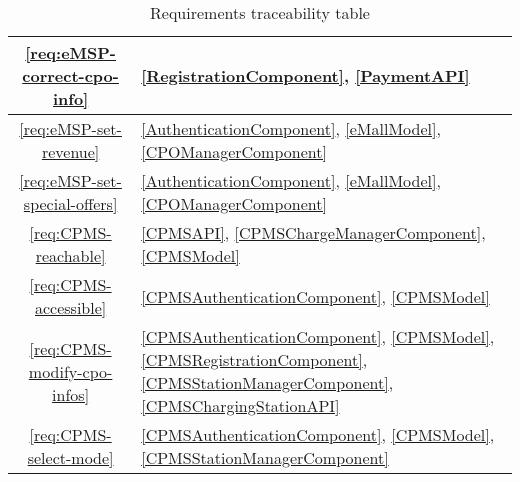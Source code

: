 \begin{table}[h]
\begin{center}
\begin{tabular}{|c||p{15.5cm}|}
                  \hline
                  \ref{req:eMSP-correct-cpo-info}      &
                  \ref{RegistrationComponent},
                  \ref{PaymentAPI}
                  \\
                  \hline
                  \ref{req:eMSP-set-revenue}           &
                  \ref{AuthenticationComponent},
                  \ref{eMallModel},
                  \ref{CPOManagerComponent}
                  \\
                  \hline
                  \ref{req:eMSP-set-special-offers}    &
                  \ref{AuthenticationComponent},
                  \ref{eMallModel},
                  \ref{CPOManagerComponent}
                  \\
                  \hline
                  \ref{req:CPMS-reachable}             &
                  \ref{CPMSAPI},
                  \ref{CPMSChargeManagerComponent},
                  \ref{CPMSModel}
                  \\
                  \hline
                  \ref{req:CPMS-accessible}            &
                  \ref{CPMSAuthenticationComponent},
                  \ref{CPMSModel}
                  \\
                  \hline
                  \ref{req:CPMS-modify-cpo-infos}      &
                  \ref{CPMSAuthenticationComponent},
                  \ref{CPMSModel},
                  \ref{CPMSRegistrationComponent},
                  \ref{CPMSStationManagerComponent},
                  \ref{CPMSChargingStationAPI}
                  \\
                  \hline
                  \ref{req:CPMS-select-mode}           &
                  \ref{CPMSAuthenticationComponent},
                  \ref{CPMSModel},
                  \ref{CPMSStationManagerComponent}
                  \\
                  \hline
            \end{tabular}
      \end{center}
      \caption{Requirements traceability table}
      \label{requirements-traceability-table}
\end{table}


